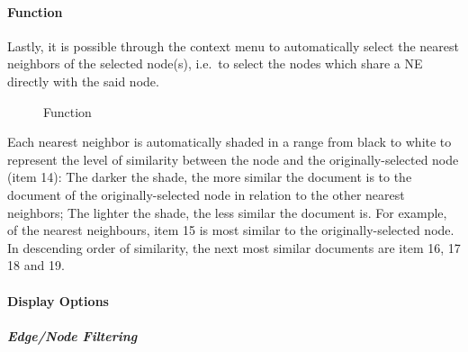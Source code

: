 \paragraph{ Function}
Lastly, it is possible through the context menu to automatically select the nearest neighbors of the
selected node(s), i.e.\ to select the nodes which share a NE directly with the said node.
\begin{figure}[ht]
\centering
\caption{ Function}
\end{figure}

Each nearest neighbor is automatically shaded in a range from black to white to represent the level
of similarity between the node and the originally-selected node (item 14): The darker the shade, the
more similar the document is to the document of the originally-selected node in relation to the
other nearest neighbors; The lighter the shade, the less similar the document is. For example, of
the nearest neighbours, item 15 is most similar to the originally-selected node. In descending order
of similarity, the next most similar documents are item 16, 17 18 and 19.
\paragraph{Display Options}
\subparagraph{Edge/Node Filtering}

